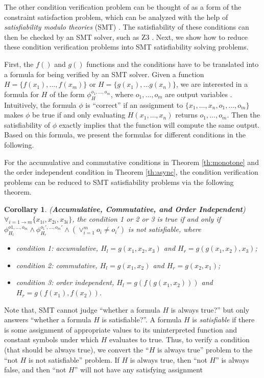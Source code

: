 The other condition verification problem can be thought of as a form of the constraint satisfaction problem, which can be analyzed with the help of \emph{satisfiability modulo theories} (SMT) \cite{53e486195688442995f82bfe28c55731}. The satisfiability of these conditions can then be checked by an SMT solver, such as Z3 \cite{DeMoura:2008:ZES:1792734.1792766}. Next, we show how to reduce these condition verification problems into SMT satisfiability solving problems.

First, the $f()$ and $g()$ functions and the conditions have to be translated into a formula for being verified by an SMT solver. Given a function $H=\{f(x_1),\ldots,f(x_m)\}$ or $H=\{g(x_1),...g(x_n)\}$, we are interested in a formula for $H$ of the form $\phi_H^{o_1,\ldots,o_m}$, where $o_1,\ldots,o_m$ are output variables \cite{Liu:2014:ADP:2670979.2670980}. Intuitively, the formula $\phi$ is ``correct'' if an assignment to $\{x_1,\ldots,x_n,o_1,\ldots,o_m\}$ makes $\phi$ be true if and only evaluating $H(x_1,\ldots,x_n)$ returns $o_1,\ldots,o_m$. Then the satisfiability of $\phi$ exactly implies that the function will compute the same output. Based on this formula, we present the formulas for different conditions in the following.

For the accumulative and commutative conditions in Theorem \ref{th:monotone} and the order independent condition in Theorem \ref{th:async}, the condition verification problems can be reduced to SMT satisfiability problems via the following theorem.

\newtheorem{corollary}{Corollary}
\begin{corollary}
	\label{coro:auto:1}
	(\textbf{Accumulative, Commutative, and Order Independent}) $\forall_{i=1\to m} \{x_{1i},x_{2i},x_{3i}\}$, the condition 1 or 2 or 3 is true if and only if $\phi_{H_l}^{o1,\ldots,o_m}\wedge \phi_{H_r}^{o_1',\ldots,o_m'}\wedge (\vee_{i=1}^m{o_i\neq o_i'})$ is not satisfiable, where
	\begin{itemize}
		\item condition 1: accumulative, $H_l=g(x_1,x_2,x_3)$ and $H_r=g(g(x_1,x_2),x_3)$;
		\item condition 2: commutative, $H_l=g(x_1,x_2)$ and $H_r=g(x_2,x_1)$;
		\item condition 3: order independent, $H_l=g(f(g(x_1,x_2)))$ and $H_r=g(f(x_1),f(x_2))$.
	\end{itemize}
\end{corollary}

Note that, SMT cannot judge ``whether a formula $H$ is always true?'' but only answers ``whether a formula $H$ is satisfiable?''. A formula $H$ is \emph{satisfiable} if there is some assignment of appropriate values to its uninterpreted function and constant symbols under which $H$ evaluates to true. Thus, to verify a condition (that should be always true), we convert the ``$H$ is always true'' problem to the ``not $H$ is not satisfiable'' problem. If $H$ is always true, then ``not $H$'' is always false, and then ``not $H$'' will not have any satisfying assignment


